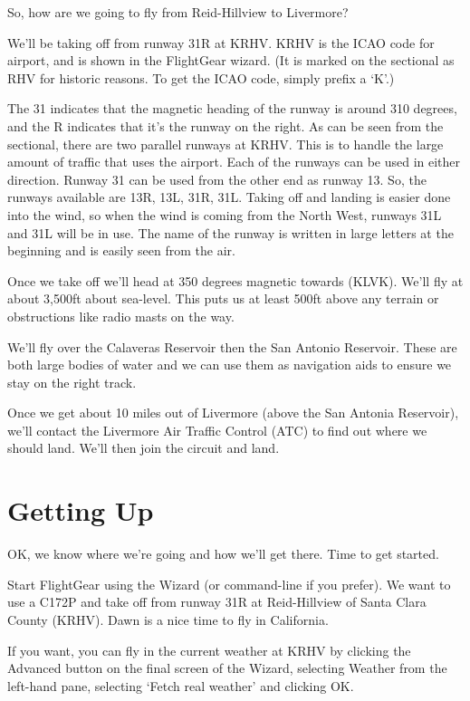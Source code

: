 So, how are we going to fly from Reid-Hillview to Livermore?

We'll be taking off from runway 31R at KRHV. KRHV is the ICAO code 
for  airport, and is shown in the FlightGear wizard. 
(It is marked on the sectional as RHV for historic reasons. 
To get the ICAO code, simply prefix a `K'.)

The 31 indicates that the magnetic heading of the runway is around 310 degrees, 
and the R indicates that it's the runway on the right. As can be seen from the 
sectional, there are two parallel runways at KRHV. This is to handle the large 
amount of traffic that uses the airport. Each of the runways can be used in 
either direction. Runway 31 can be used from the other end as runway 13. 
So, the runways available are 13R, 13L, 31R, 31L. Taking off and landing 
is easier done into the wind, so when the wind is coming from the North West, 
runways 31L and 31L will be in use. The name of the runway is written in large 
letters at the beginning and is easily seen from the air. 

Once we take off we'll head at 350 degrees magnetic towards  (KLVK). 
We'll fly at about 3,500ft about sea-level. This puts us at least 500ft above any 
terrain or obstructions like radio masts on the way.

We'll fly over the Calaveras Reservoir then the San Antonio Reservoir. These are 
both large bodies of water and we can use them as navigation aids to ensure we 
stay on the right track.

Once we get about 10 miles out of Livermore (above the San Antonia Reservoir), 
we'll contact the Livermore Air Traffic Control (ATC) to find out 
where we should land. We'll then join the circuit and land.

\section{Getting Up}

OK, we know where we're going and how we'll get there. Time to get started.

Start FlightGear using the Wizard (or command-line if you prefer).
 We want to use a C172P and take off from runway 31R at Reid-Hillview of 
 Santa Clara County (KRHV). Dawn is a nice time to fly in California.

If you want, you can fly in the current weather at KRHV by clicking the 
Advanced button on the final screen of the Wizard, selecting Weather 
from the left-hand pane, selecting `Fetch real weather' and clicking OK. 

